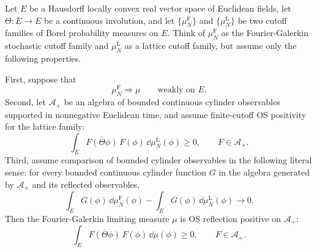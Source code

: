 \begin{remark}
\label{rem:spde-regulator-comparison-os-criterion}
Let \(E\) be a Hausdorff locally convex real vector space of Euclidean
fields, let \(\Theta:E\to E\) be a continuous involution, and let
\(\{\mu_N^{\mathrm F}\}\) and \(\{\mu_N^{\mathrm L}\}\) be two cutoff
families of Borel probability measures on \(E\).  Think of
\(\mu_N^{\mathrm F}\) as the Fourier-Galerkin stochastic cutoff family and
\(\mu_N^{\mathrm L}\) as a lattice cutoff family, but assume only the
following properties.

First, suppose that
\[
  \mu_N^{\mathrm F}\Rightarrow\mu
  \qquad\text{weakly on }E.
\]
Second, let \(\mathcal A_+\) be an algebra of bounded continuous cylinder
observables supported in nonnegative Euclidean time, and assume finite-cutoff
OS positivity for the lattice family:
\begin{equation}
  \int_E \overline{F(\Theta\phi)}\,F(\phi)\,
  \dd\mu_N^{\mathrm L}(\phi)
  \geq0,
  \qquad F\in\mathcal A_+.
  \label{eq:spde-lattice-family-os-positive}
\end{equation}
Third, assume comparison of bounded cylinder observables in the following
literal sense: for every bounded continuous cylinder function \(G\) in the
algebra generated by \(\mathcal A_+\) and its reflected observables,
\begin{equation}
  \int_E G(\phi)\,\dd\mu_N^{\mathrm F}(\phi)
  -
  \int_E G(\phi)\,\dd\mu_N^{\mathrm L}(\phi)
  \longrightarrow0 .
  \label{eq:spde-bounded-cylinder-regulator-comparison}
\end{equation}
Then the Fourier-Galerkin limiting measure \(\mu\) is OS reflection positive
on \(\mathcal A_+\):
\begin{equation}
  \int_E \overline{F(\Theta\phi)}\,F(\phi)\,\dd\mu(\phi)\geq0,
  \qquad F\in\mathcal A_+.
  \label{eq:spde-regulator-comparison-limit-os-positive}
\end{equation}


\end{remark}
